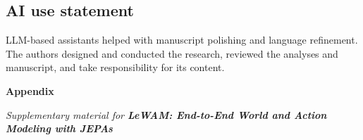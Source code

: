 \documentclass{article} %
\begin{document}
\subsection*{AI use statement}
LLM-based assistants helped with manuscript polishing and language refinement. The authors designed and conducted the research, reviewed the analyses and manuscript, and take responsibility for its content.




\clearpage
\appendix
{}
\label{app:roadmap}

\begingroup
\centering
\vspace*{-0.6em}
{\LARGE\bfseries\sffamily Appendix\par}
\vspace{0.35em}
{\small\itshape\sffamily Supplementary material for
\textbf{LeWAM: End-to-End World and Action Modeling with JEPAs}\par}
\vspace{1.0em}
\endgroup
\end{document}

